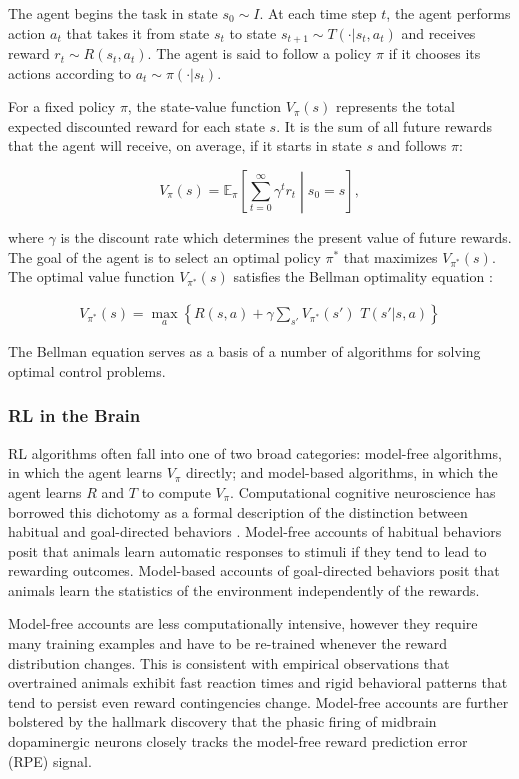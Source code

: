 \documentclass[11pt]{article}
\begin{document}
The agent begins the task in state $s_0 \sim I$. At each time step $t$, the agent performs action $a_t$ that takes it from state $s_t$ to state $s_{t+1} \sim T(\cdot|s_t,a_t)$ and receives reward $r_t \sim R(s_t, a_t)$. The agent is said to follow a policy $\pi$ if it chooses its actions according to $a_t \sim \pi(\cdot|s_t)$.

For a fixed policy $\pi$, the state-value function $V_\pi(s)$ represents the total expected discounted reward for each state $s$. It is the sum of all future rewards that the agent will receive, on average, if it starts in state $s$ and follows $\pi$:

\[
V_{\pi}(s) = \mathbb{E}_{\pi} \left[  \sum_{t=0}^{\infty} \gamma^{t} r_t \middle| s_0 = s \right] ,
\]

where $\gamma$ is the discount rate which determines the present value of future rewards. The goal of the agent is to select an optimal policy $\pi^*$ that maximizes $V_{\pi^*}(s)$. The optimal value function $V_{\pi^*}(s)$ satisfies the Bellman optimality equation \cite{Bellman1957}:

\begin{align*}
V_{\pi^*}(s) = \max_a  \left\{ R(s,a) + \gamma \sum_{s'} V_{\pi^*}(s') \,\, T(s'|s,a) \right\} 
\end{align*}

The Bellman equation serves as a basis of a number of algorithms for solving optimal control problems.

\subsubsection{RL in the Brain}

RL algorithms often fall into one of two broad categories: model-free algorithms, in which the agent learns $V_\pi$ directly; and model-based algorithms, in which the agent learns $R$ and $T$ to compute $V_\pi$.  Computational cognitive neuroscience has borrowed this dichotomy as a formal description of the distinction between habitual and goal-directed behaviors \cite{Dolan2013}. Model-free accounts of habitual behaviors posit that animals learn automatic responses to stimuli if they tend to lead to rewarding outcomes. Model-based accounts of goal-directed behaviors posit that animals learn the statistics of the environment independently of the rewards.

Model-free accounts are less computationally intensive, however they require many training examples and have to be re-trained whenever the reward distribution changes. This is consistent with empirical observations that overtrained animals exhibit fast reaction times and rigid behavioral patterns that tend to persist even reward contingencies change. Model-free accounts are further bolstered by the hallmark discovery that the phasic firing of midbrain dopaminergic neurons closely tracks the model-free reward prediction error (RPE) signal.
\end{document}
